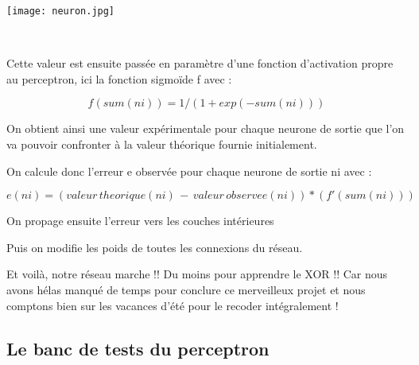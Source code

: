 \begin{center}
	
	\texttt{[image: neuron.jpg]}\\
	\caption{\emph{Calcul de la sortie d'un neurone}}\\
\end{center}




Cette valeur est ensuite pass\'ee en param\`etre d'une fonction
d'activation propre au perceptron, ici la fonction sigmo\"ide f avec :  

\[f(sum(ni)) = 1/(1+exp(-sum(ni))) 
\]%

On obtient ainsi une valeur exp\'erimentale pour chaque neurone de
sortie que l'on va pouvoir confronter \`a la valeur th\'eorique fournie
initialement.

On calcule donc l'erreur e observ\'ee pour chaque neurone de sortie ni avec :

\[
	e(ni) = (valeur\, theorique(ni)\, -\, valeur\, observee(ni))*(f'(sum(ni)))
\]


On propage ensuite l'erreur vers les couches intérieures 

Puis on modifie les poids de toutes les connexions du réseau.

Et voilà, notre réseau marche !! Du moins pour apprendre le XOR !! Car
nous avons hélas manqué de temps pour conclure ce merveilleux projet et
nous comptons bien sur les vacances d'été pour le recoder intégralement
!




\subsection{Le banc de tests du perceptron} %
\label{subsec:le_banc_de_tests_du_perceptron}

